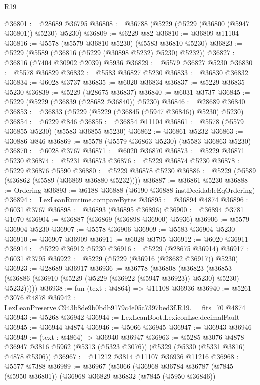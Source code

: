 \begin{lexlean}{R19}
\begin{coremodule}
@36801 := @28689 @36795
@36808 := @36788 (@5229 (@5229 (@36800 (@5947 @36801)) @5230) @5230)
@36809 := @6229 @82
@36810 := @36809 @11104
@36816 := @5578 (@5579 @36810 @5230) (@5583 @36810 @5230)
@36823 := @5229 (@5589 (@36816 (@5229 (@30898 @5232) @5230) @5232))
@36827 := @36816 (@7404 @30902 @2039) @5936
@36829 := @5579 @36827 @5230
@36830 := @5578 @36829
@36832 := @5583 @36827 @5230
@36833 := @36830 @36832
@36834 := @6028 @3737
@36835 := @6020 @36834
@36837 := @5229 @36835 @5230
@36839 := @5229 (@28675 @36837)
@36840 := @6031 @3737
@36845 := @5229 (@5229 (@36839 (@28682 @36840)) @5230)
@36846 := @28689 @36840
@36853 := @36833 (@5229 (@5229 (@36845 (@5947 @36846)) @5230) @5230)
@36854 := @6229 @846
@36855 := @36854 @11104
@36861 := @5578 (@5579 @36855 @5230) (@5583 @36855 @5230)
@36862 := @36861 @5232
@36863 := @30886 @846
@36869 := @5578 (@5579 @36863 @5230) (@5583 @36863 @5230)
@36870 := @6028 @3767
@36871 := @6020 @36870
@36873 := @5229 @36871 @5230
@36874 := @5231 @36873
@36876 := @5229 @36874 @5230
@36878 := @5229 @36876 @5590
@36880 := @5229 @36878 @5230
@36886 := @5229 (@5589 (@36862 (@5589 (@36869 @36880 @5232))))
@36887 := @36861 @5230
@36888 := Ordering
@36893 := @6188 @36888 (@6190 @36888 instDecidableEqOrdering)
@36894 := LexLeanRuntime.compareBytes
@36895 := @36894 @4874
@36896 := @6031 @3767
@36898 := @36893 (@36895 @36896)
@36900 := @36894 @3781 @1070
@36904 := @36887 (@36869 (@36898 @36900) @5936)
@36906 := @5579 @36904 @5230
@36907 := @5578 @36906
@36909 := @5583 @36904 @5230
@36910 := @36907 @36909
@36911 := @6028 @3795
@36912 := @6020 @36911
@36914 := @5229 @36912 @5230
@36916 := @5229 (@28675 @36914)
@36917 := @6031 @3795
@36922 := @5229 (@5229 (@36916 (@28682 @36917)) @5230)
@36923 := @28689 @36917
@36936 := @36778
    (@36808
      (@36823 (@36853 (@36886 (@36910 (@5229 (@5229 (@36922 (@5947 @36923)) @5230) @5230) @5232)))))
@36938 := fun (text : @4864) => @11108 @36936
@36940 := @5261 @3076 @4878
@36942 := LexLeanPreserve.C943b8de9b0bdb9179c4e05c7397bed3f.R19.__fits_70 @4874
@36943 := @5268 @36942
@36944 := LexLeanBoot.LexiconLse.decimalFault
@36945 := @36944 @4874
@36946 := @5066 @36945
@36947 := @36943 @36946
@36949 := (text : @4864) -> @36940 @36947
@36963 := @5285
    @3076
    @4878
    @36947
    @3816
    @5962
    (@5313 (@5323 @3076))
    (@5329 (@5330 (@5331 @3816) @4878 @5306))
@36967 := @11212 @3814 @11107 @36936 @11216
@36968 := @5577 @7388
@36989 := @36967
    (@5066
      (@36968
        @36784
        @36787
        (@7845 (@5950 @36801))
        (@36968
          @36829
          @36832
          (@7845 (@5950 @36846))

\end{coremodule}
\end{lexlean}

